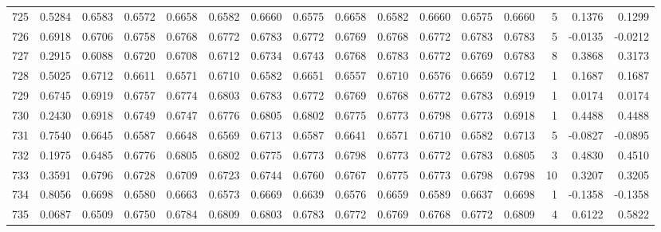 \begin{tabular}{lrrrrrrrrrrrrrrr}
725 &      0.5284 &  0.6583 &  0.6572 &  0.6658 &  0.6582 &  0.6660 &  0.6575 &  0.6658 &  0.6582 &  0.6660 &   0.6575 &     0.6660 &      5 &                    0.1376 &                     0.1299 \\
726 &      0.6918 &  0.6706 &  0.6758 &  0.6768 &  0.6772 &  0.6783 &  0.6772 &  0.6769 &  0.6768 &  0.6772 &   0.6783 &     0.6783 &      5 &                   -0.0135 &                    -0.0212 \\
727 &      0.2915 &  0.6088 &  0.6720 &  0.6708 &  0.6712 &  0.6734 &  0.6743 &  0.6768 &  0.6783 &  0.6772 &   0.6769 &     0.6783 &      8 &                    0.3868 &                     0.3173 \\
728 &      0.5025 &  0.6712 &  0.6611 &  0.6571 &  0.6710 &  0.6582 &  0.6651 &  0.6557 &  0.6710 &  0.6576 &   0.6659 &     0.6712 &      1 &                    0.1687 &                     0.1687 \\
729 &      0.6745 &  0.6919 &  0.6757 &  0.6774 &  0.6803 &  0.6783 &  0.6772 &  0.6769 &  0.6768 &  0.6772 &   0.6783 &     0.6919 &      1 &                    0.0174 &                     0.0174 \\
730 &      0.2430 &  0.6918 &  0.6749 &  0.6747 &  0.6776 &  0.6805 &  0.6802 &  0.6775 &  0.6773 &  0.6798 &   0.6773 &     0.6918 &      1 &                    0.4488 &                     0.4488 \\
731 &      0.7540 &  0.6645 &  0.6587 &  0.6648 &  0.6569 &  0.6713 &  0.6587 &  0.6641 &  0.6571 &  0.6710 &   0.6582 &     0.6713 &      5 &                   -0.0827 &                    -0.0895 \\
732 &      0.1975 &  0.6485 &  0.6776 &  0.6805 &  0.6802 &  0.6775 &  0.6773 &  0.6798 &  0.6773 &  0.6772 &   0.6783 &     0.6805 &      3 &                    0.4830 &                     0.4510 \\
733 &      0.3591 &  0.6796 &  0.6728 &  0.6709 &  0.6723 &  0.6744 &  0.6760 &  0.6767 &  0.6775 &  0.6773 &   0.6798 &     0.6798 &     10 &                    0.3207 &                     0.3205 \\
734 &      0.8056 &  0.6698 &  0.6580 &  0.6663 &  0.6573 &  0.6669 &  0.6639 &  0.6576 &  0.6659 &  0.6589 &   0.6637 &     0.6698 &      1 &                   -0.1358 &                    -0.1358 \\
735 &      0.0687 &  0.6509 &  0.6750 &  0.6784 &  0.6809 &  0.6803 &  0.6783 &  0.6772 &  0.6769 &  0.6768 &   0.6772 &     0.6809 &      4 &                    0.6122 &                     0.5822 \\

\end{tabular}
